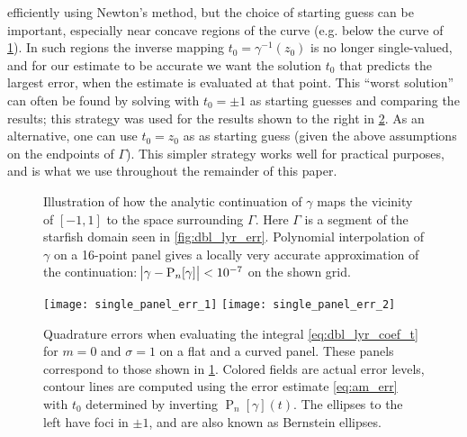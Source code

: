 \documentclass[hidelinks]{siamart1116}
\newlength\fwidth
\begin{document}
efficiently using Newton's method, but the choice of starting guess
can be important, especially near concave regions of the curve
(e.g. below the curve of \cref{fig:grid_mapping}). In such regions the
inverse mapping $t_0 = \gamma^{-1}(z_0)$ is no longer single-valued,
and for our estimate to be accurate we want the solution $t_0$ that
predicts the largest error, when the estimate is evaluated at that
point. This ``worst solution'' can often be found by solving with
$t_0 = \pm 1$ as starting guesses and comparing the results; this
strategy was used for the results shown to the right in
\cref{fig:panel_err}. As an alternative, one can use $t_0=z_0$ as as
starting guess (given the above assumptions on the endpoints of
$\Gamma$). This simpler strategy works well for practical purposes,
and is what we use throughout the remainder of this paper.

\begin{figure}[htbp]
  \centering
  

  \setlength{}
  \hspace{2em}  
  \setlength{}
  \begin{tikzpicture}
    

  \end{tikzpicture}

  \caption{Illustration of how the analytic continuation of $\gamma$
    maps the vicinity of $[-1,1]$ to the space surrounding
    $\Gamma$. Here $\Gamma$ is a segment of the starfish domain seen
    in \cref{fig:dbl_lyr_err}. Polynomial interpolation of
    $\gamma$ on a 16-point panel gives a locally very accurate
    approximation of the continuation:
    $\abs{\gamma - {\operatorname{P}}_n[\gamma]} < 10^{-7}$ on the shown grid.}
  \label{fig:grid_mapping}
\end{figure}
\begin{figure}[htbp]
  \centering
  
  \texttt{[image: single\_panel\_err\_1]}
  \hspace{2em}
  \texttt{[image: single\_panel\_err\_2]}
  \caption{Quadrature errors when evaluating the integral
    \eqref{eq:dbl_lyr_coef_t} for $m=0$ and ${\sigma}=1$ on a flat and a
    curved panel. These panels correspond to those shown in 
    \cref{fig:grid_mapping}.  Colored fields are actual error levels,
    contour lines are computed using the error estimate
    \eqref{eq:am_err} with $t_0$ determined by inverting
    ${\operatorname{P}}_n[\gamma](t)$. The ellipses to the left have foci in
    $\pm 1$, and are also known as Bernstein ellipses.}
  \label{fig:panel_err}
\end{figure}
\end{document}
